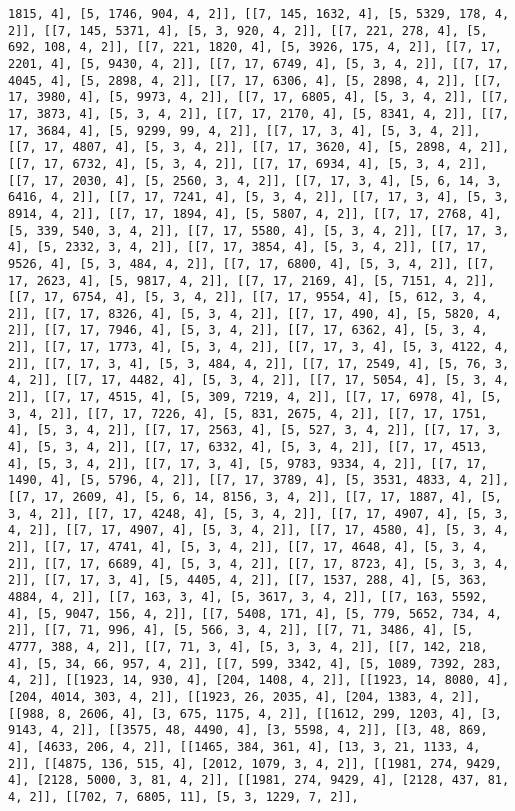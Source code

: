 \documentclass[12pt,fleqn]{article}\usepackage{../../common}
\begin{document}
\begin{verbatim}
1815, 4], [5, 1746, 904, 4, 2]], [[7, 145, 1632, 4], [5, 5329, 178, 4, 2]], [[7, 145, 5371, 4], [5, 3, 920, 4, 2]], [[7, 221, 278, 4], [5, 692, 108, 4, 2]], [[7, 221, 1820, 4], [5, 3926, 175, 4, 2]], [[7, 17, 2201, 4], [5, 9430, 4, 2]], [[7, 17, 6749, 4], [5, 3, 4, 2]], [[7, 17, 4045, 4], [5, 2898, 4, 2]], [[7, 17, 6306, 4], [5, 2898, 4, 2]], [[7, 17, 3980, 4], [5, 9973, 4, 2]], [[7, 17, 6805, 4], [5, 3, 4, 2]], [[7, 17, 3873, 4], [5, 3, 4, 2]], [[7, 17, 2170, 4], [5, 8341, 4, 2]], [[7, 17, 3684, 4], [5, 9299, 99, 4, 2]], [[7, 17, 3, 4], [5, 3, 4, 2]], [[7, 17, 4807, 4], [5, 3, 4, 2]], [[7, 17, 3620, 4], [5, 2898, 4, 2]], [[7, 17, 6732, 4], [5, 3, 4, 2]], [[7, 17, 6934, 4], [5, 3, 4, 2]], [[7, 17, 2030, 4], [5, 2560, 3, 4, 2]], [[7, 17, 3, 4], [5, 6, 14, 3, 6416, 4, 2]], [[7, 17, 7241, 4], [5, 3, 4, 2]], [[7, 17, 3, 4], [5, 3, 8914, 4, 2]], [[7, 17, 1894, 4], [5, 5807, 4, 2]], [[7, 17, 2768, 4], [5, 339, 540, 3, 4, 2]], [[7, 17, 5580, 4], [5, 3, 4, 2]], [[7, 17, 3, 4], [5, 2332, 3, 4, 2]], [[7, 17, 3854, 4], [5, 3, 4, 2]], [[7, 17, 9526, 4], [5, 3, 484, 4, 2]], [[7, 17, 6800, 4], [5, 3, 4, 2]], [[7, 17, 2623, 4], [5, 9817, 4, 2]], [[7, 17, 2169, 4], [5, 7151, 4, 2]], [[7, 17, 6754, 4], [5, 3, 4, 2]], [[7, 17, 9554, 4], [5, 612, 3, 4, 2]], [[7, 17, 8326, 4], [5, 3, 4, 2]], [[7, 17, 490, 4], [5, 5820, 4, 2]], [[7, 17, 7946, 4], [5, 3, 4, 2]], [[7, 17, 6362, 4], [5, 3, 4, 2]], [[7, 17, 1773, 4], [5, 3, 4, 2]], [[7, 17, 3, 4], [5, 3, 4122, 4, 2]], [[7, 17, 3, 4], [5, 3, 484, 4, 2]], [[7, 17, 2549, 4], [5, 76, 3, 4, 2]], [[7, 17, 4482, 4], [5, 3, 4, 2]], [[7, 17, 5054, 4], [5, 3, 4, 2]], [[7, 17, 4515, 4], [5, 309, 7219, 4, 2]], [[7, 17, 6978, 4], [5, 3, 4, 2]], [[7, 17, 7226, 4], [5, 831, 2675, 4, 2]], [[7, 17, 1751, 4], [5, 3, 4, 2]], [[7, 17, 2563, 4], [5, 527, 3, 4, 2]], [[7, 17, 3, 4], [5, 3, 4, 2]], [[7, 17, 6332, 4], [5, 3, 4, 2]], [[7, 17, 4513, 4], [5, 3, 4, 2]], [[7, 17, 3, 4], [5, 9783, 9334, 4, 2]], [[7, 17, 1490, 4], [5, 5796, 4, 2]], [[7, 17, 3789, 4], [5, 3531, 4833, 4, 2]], [[7, 17, 2609, 4], [5, 6, 14, 8156, 3, 4, 2]], [[7, 17, 1887, 4], [5, 3, 4, 2]], [[7, 17, 4248, 4], [5, 3, 4, 2]], [[7, 17, 4907, 4], [5, 3, 4, 2]], [[7, 17, 4907, 4], [5, 3, 4, 2]], [[7, 17, 4580, 4], [5, 3, 4, 2]], [[7, 17, 4741, 4], [5, 3, 4, 2]], [[7, 17, 4648, 4], [5, 3, 4, 2]], [[7, 17, 6689, 4], [5, 3, 4, 2]], [[7, 17, 8723, 4], [5, 3, 3, 4, 2]], [[7, 17, 3, 4], [5, 4405, 4, 2]], [[7, 1537, 288, 4], [5, 363, 4884, 4, 2]], [[7, 163, 3, 4], [5, 3617, 3, 4, 2]], [[7, 163, 5592, 4], [5, 9047, 156, 4, 2]], [[7, 5408, 171, 4], [5, 779, 5652, 734, 4, 2]], [[7, 71, 996, 4], [5, 566, 3, 4, 2]], [[7, 71, 3486, 4], [5, 4777, 388, 4, 2]], [[7, 71, 3, 4], [5, 3, 3, 4, 2]], [[7, 142, 218, 4], [5, 34, 66, 957, 4, 2]], [[7, 599, 3342, 4], [5, 1089, 7392, 283, 4, 2]], [[1923, 14, 930, 4], [204, 1408, 4, 2]], [[1923, 14, 8080, 4], [204, 4014, 303, 4, 2]], [[1923, 26, 2035, 4], [204, 1383, 4, 2]], [[988, 8, 2606, 4], [3, 675, 1175, 4, 2]], [[1612, 299, 1203, 4], [3, 9143, 4, 2]], [[3575, 48, 4490, 4], [3, 5598, 4, 2]], [[3, 48, 869, 4], [4633, 206, 4, 2]], [[1465, 384, 361, 4], [13, 3, 21, 1133, 4, 2]], [[4875, 136, 515, 4], [2012, 1079, 3, 4, 2]], [[1981, 274, 9429, 4], [2128, 5000, 3, 81, 4, 2]], [[1981, 274, 9429, 4], [2128, 437, 81, 4, 2]], [[702, 7, 6805, 11], [5, 3, 1229, 7, 2]], 
\end{verbatim}
\end{document}
